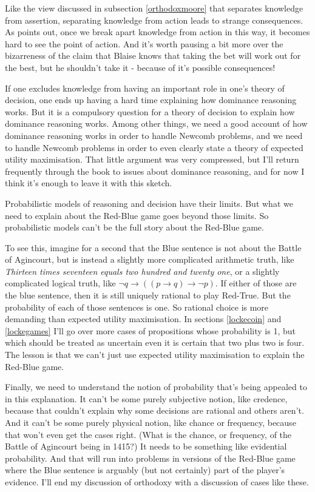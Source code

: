 \documentclass[11pt,]{book}
\begin{document}
Like the view discussed in subsection \ref{orthodoxmoore} that separates knowledge from assertion, separating knowledge from action leads to strange consequences. As \citet{Williamson2005} points out, once we break apart knowledge from action in this way, it becomes hard to see the point of action. And it's worth pausing a bit more over the bizarreness of the claim that Blaise knows that taking the bet will work out for the best, but he shouldn't take it - because of it's possible consequences!

If one excludes knowledge from having an important role in one's theory of decision, one ends up having a hard time explaining how dominance reasoning works. But it is a compulsory question for a theory of decision to explain how dominance reasoning works. Among other things, we need a good account of how dominance reasoning works in order to handle Newcomb problems, and we need to handle Newcomb problems in order to even clearly state a theory of expected utility maximisation. That little argument was very compressed, but I'll return frequently through the book to issues about dominance reasoning, and for now I think it's enough to leave it with this sketch.

Probabilistic models of reasoning and decision have their limits. But what we need to explain about the Red-Blue game goes beyond those limits. So probabilistic models can't be the full story about the Red-Blue game.

To see this, imagine for a second that the Blue sentence is not about the Battle of Agincourt, but is instead a slightly more complicated arithmetic truth, like \emph{Thirteen times seventeen equals two hundred and twenty one}, or a slightly complicated logical truth, like \(\neg q \rightarrow ((p \rightarrow q) \rightarrow \neg p)\). If either of those are the blue sentence, then it is still uniquely rational to play Red-True. But the probability of each of those sentences is one. So rational choice is more demanding than expected utility maximisation. In sections \ref{lockecoin} and \ref{lockegames} I'll go over more cases of propositions whose probability is 1, but which should be treated as uncertain even it is certain that two plus two is four. The lesson is that we can't just use expected utility maximisation to explain the Red-Blue game.

Finally, we need to understand the notion of probability that's being appealed to in this explanation. It can't be some purely subjective notion, like credence, because that couldn't explain why some decisions are rational and others aren't. And it can't be some purely physical notion, like chance or frequency, because that won't even get the cases right. (What is the chance, or frequency, of the Battle of Agincourt being in 1415?) It needs to be something like evidential probability. And that will run into problems in versions of the Red-Blue game where the Blue sentence is arguably (but not certainly) part of the player's evidence. I'll end my discussion of orthodoxy with a discussion of cases like these.
\end{document}
